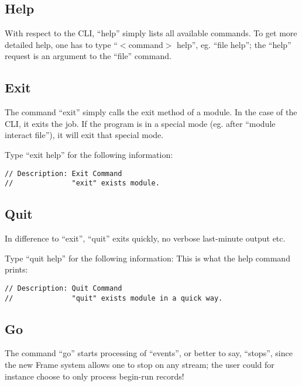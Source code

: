 \documentclass[12pt]{article}
\begin{document}
\subsection{Help }
\label{sec:HelpCommand}

With respect to the CLI, ``help'' simply lists all available commands.
To get more detailed help, one has to type ``$<$command$>$ help'',
eg. ``file help''; the ``help'' request is an argument to the
``file'' command.

\subsection{Exit }
\label{sec:ExitCommand}

The command ``exit'' simply calls the exit method of a module. In the
case of the CLI, it exits the job. If the program is in a special mode
(eg. after ``module interact file''), it will exit that special mode.

Type ``exit help'' for the following information:
%
\begin{verbatim}
// Description: Exit Command
//              "exit" exists module.
\end{verbatim}

\subsection{Quit }
\label{sec:QuitCommand}

In difference to ``exit'', ``quit'' exits quickly, no verbose
last-minute output etc.

Type ``quit help'' for the following information:
%
This is what the help command prints:
\begin{verbatim}
// Description: Quit Command
//              "quit" exists module in a quick way.
\end{verbatim}

\subsection{Go }
\label{sec:GoCommand}

The command ``go'' starts processing of ``events'', or better to say,
``stops'', since the new Frame system allows one to stop on any stream;
the user could for instance choose to only process begin-run records!
\end{document}
